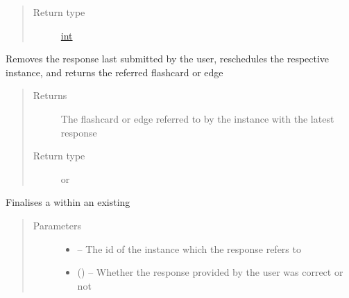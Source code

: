 \documentclass[letterpaper,10pt,english]{sphinxmanual}
\begin{document}
\begin{fulllineitems}
\begin{fulllineitems}
\begin{quote}
\begin{description}
\item[{Return type}] \leavevmode
\href{https://docs.python.org/2/library/functions.html\#int}{int}

\end{description}\end{quote}

\end{fulllineitems}


\begin{fulllineitems}
\label{\detokenize{user:user.User.undo}}
Removes the response last submitted by the user, reschedules the respective instance, and returns the referred flashcard or edge
\begin{quote}\begin{description}
\item[{Returns}] \leavevmode
The flashcard or edge referred to by the instance with the latest response

\item[{Return type}] \leavevmode
{\hyperref[\detokenize{flashcard:flashcard.Flashcard}]{}} or {\hyperref[\detokenize{edge:edge.Edge}]{}}

\end{description}\end{quote}

\end{fulllineitems}


\begin{fulllineitems}
\label{\detokenize{user:user.User.validate}}
Finalises a  within an existing 
\begin{quote}\begin{description}
\item[{Parameters}] \leavevmode\begin{itemize}
\item {} 
 -- The id of the instance which the response refers to

\item {} 
 () -- Whether the response provided by the user was correct or not

\end{itemize}

\end{description}\end{quote}

\end{fulllineitems}


\end{fulllineitems}
\end{document}
